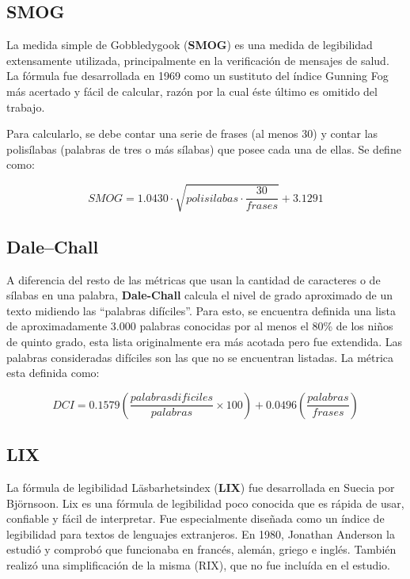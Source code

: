 \documentclass[12pt,journal,compsoc]{IEEEtran}
\begin{document}
\subsection{SMOG}
La medida simple de Gobbledygook (\textbf{SMOG})\cite{smog} es una medida de legibilidad extensamente utilizada, principalmente en la verificación de mensajes de salud\cite{hedman}. La fórmula fue desarrollada en 1969 como un sustituto del índice Gunning Fog más acertado y fácil de calcular, razón por la cual éste último es omitido del trabajo.

Para calcularlo, se debe contar una serie de frases (al menos 30) y contar las polisílabas (palabras de tres o más sílabas) que posee cada una de ellas. Se define como: 

$$SMOG = 1.0430\cdot \sqrt{polisilabas \cdot \frac{30}{frases}} + 3.1291$$

\subsection{Dale–Chall}
A diferencia del resto de las métricas que usan la cantidad de caracteres o de sílabas en una palabra, \textbf{Dale-Chall}\cite{dale-chall} calcula el nivel de grado aproximado de un texto midiendo las ``palabras difíciles''. Para esto, se encuentra definida una lista de aproximadamente 3.000 palabras conocidas por al menos el 80\% de los niños de quinto grado, esta lista originalmente era más acotada pero fue extendida\cite{dale-chall-ex}. Las palabras consideradas difíciles son las que no se encuentran listadas. La métrica esta definida como:

$$DCI = 0.1579\left({\frac{{palabras dificiles}}{{palabras}}}\times 100\right)+0.0496\left({\frac{{palabras}}{{frases}}}\right)$$


\subsection{LIX}

La fórmula de legibilidad Läsbarhetsindex (\textbf{LIX})\cite{lix-rix} fue desarrollada en Suecia por Björnsoon. Lix es una fórmula de legibilidad poco conocida que es rápida de usar, confiable y fácil de interpretar. Fue especialmente diseñada como un índice de legibilidad para textos de lenguajes extranjeros. En 1980, Jonathan Anderson la estudió y comprobó que funcionaba en francés, alemán, griego e inglés. También realizó una simplificación de la misma (RIX), que no fue incluída en el estudio.
\end{document}
